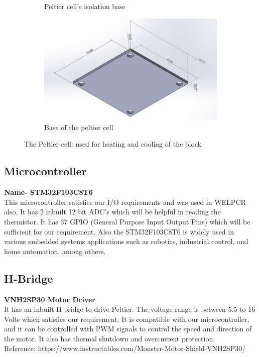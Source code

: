 \documentclass[12pt]{article}
\begin{document}
\begin{figure}[htp]
\begin{subfigure}[b]{0.3\textwidth}
        \caption{Peltier cell's isolation base}
    \end{subfigure}
    \hfill
    \begin{subfigure}[b]{0.3\textwidth}
        \centering
        \includegraphics[width=\textwidth, height= 0.8\textwidth]{Images/peltierbase.jpeg}
        \caption{Base of the peltier cell}
    \end{subfigure}
    \caption{The Peltier cell: used for heating and cooling of the block}
    \label{fig:galaxy}
\end{figure}


\subsection{Microcontroller}
\textbf{Name- STM32F103C8T6}\\
This microcontroller satisfies our I/O requirements and was used in WELPCR also. It has 2 inbuilt 12 bit ADC's which will be helpful in reading the thermistor. It has 37 GPIO (General Purpose Input Output Pins) which will be sufficient for our requirement. Also the STM32F103C8T6 is widely used in various embedded systems applications such as robotics, industrial control, and home automation, among others.

\subsection{H-Bridge}
\textbf{VNH2SP30 Motor Driver}\\
It has an inbuilt H bridge to drive Peltier. The voltage range is between 5.5 to 16 Volts which satisfies our requirement. It is compatible with our microcontroller, and it can be controlled with PWM signals to control the speed and direction of the motor. It also has thermal shutdown and overcurrent protection.\\
Reference: https://www.instructables.com/Monster-Motor-Shield-VNH2SP30/
\end{document}
